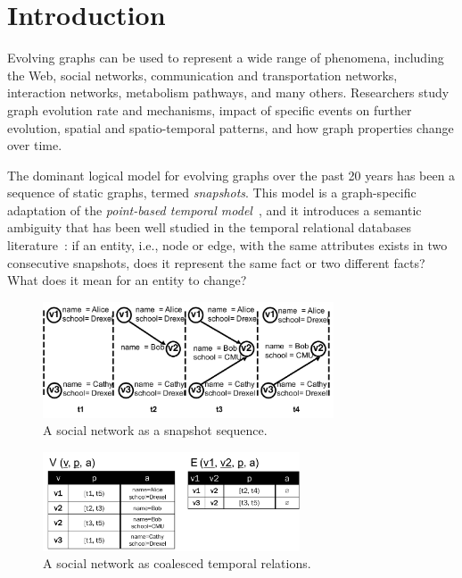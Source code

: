 \section{Introduction}
\label{sec:intro}

Evolving graphs can be used to represent a wide range of phenomena,
including the Web, social networks, communication and transportation
networks, interaction networks, metabolism pathways, and many others.
Researchers study graph evolution rate and mechanisms, impact of
specific events on further evolution, spatial and spatio-temporal
patterns, and how graph properties change over time.  

The dominant logical model for evolving graphs over the past 20 years
has been a sequence of static graphs, termed {\em snapshots}.  This
model is a graph-specific adaptation of the {\em point-based temporal
  model}~\cite{Toman2009}, and it introduces a semantic ambiguity that
has been well studied in the temporal relational databases
literature~\cite{Bohlen1998}: if an entity, i.e., node or edge, with
the same attributes exists in two consecutive snapshots, does it
represent the same fact or two different facts?  What does it mean for
an entity to change?

\begin{figure}[t!]
\includegraphics[width=3.4in]{figs/T1_graphs.pdf}
\vspace{-0.7cm}
\caption{A social network as a snapshot sequence.}
\vspace{-0.5cm}
\label{fig:snapshots}
\end{figure}

\begin{figure}[b!]
\includegraphics[width=3in]{figs/T1_relations.pdf}
\vspace{-0.2cm}
\caption{A social network as coalesced temporal relations.}
\vspace{-0.5cm}
\label{fig:coalesced}
\end{figure}

